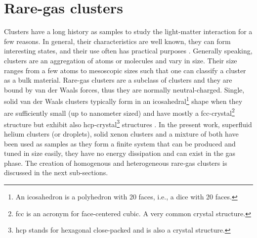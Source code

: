 \section{Rare-gas clusters}\label{sec:cluster-theory}
Clusters have a long history as samples to study the light-matter interaction for a few reasons. In general, their characteristics are well known, they can form interesting states, and their use often has practical purposes \citep{Haberland-1994-Springer}. Generally speaking, clusters are an aggregation of atoms or molecules and vary in size. Their size ranges from a few atoms to mesoscopic sizes such that one can classify a cluster as a bulk material. Rare-gas clusters are a subclass of clusters and they are bound by van der Waals forces, thus they are normally neutral-charged. Single, solid van der Waals clusters typically form in an icosahedral\footnote{An icosahedron is a polyhedron with 20 faces, i.e., a dice with 20 faces.} shape when they are sufficiently small (up to nanometer sized) \citep{Miehle-1989-JCP} and have mostly a fcc-crystal\footnote{fcc is an acronym for face-centered cubic. A very common crystal structure.} structure but exhibit also hcp-crystal\footnote{hcp stands for hexagonal close-packed and is also a crystal structure.} structures \citep{VanDeWaal-1993-JCP,Krainyukova-2006-TSF}. In the present work, superfluid helium clusters (or droplets), solid xenon clusters and a mixture of both have been used as samples as they form a finite system that can be produced and tuned in size easily, they have no energy dissipation and can exist in the gas phase. The creation of homogenous and heterogeneous rare-gas clusters is discussed in the next sub-sections.
%
%
%
